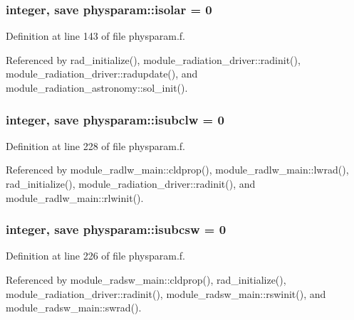 \subsubsection[{\texorpdfstring{isolar}{isolar}}]{\setlength{\rightskip}{0pt plus 5cm}integer, save physparam\+::isolar = 0}\hypertarget{namespacephysparam_adf09a9ec1939f1ee47bb4190a9098941}{}\label{namespacephysparam_adf09a9ec1939f1ee47bb4190a9098941}


Definition at line 143 of file physparam.\+f.



Referenced by rad\+\_\+initialize(), module\+\_\+radiation\+\_\+driver\+::radinit(), module\+\_\+radiation\+\_\+driver\+::radupdate(), and module\+\_\+radiation\+\_\+astronomy\+::sol\+\_\+init().

\subsubsection[{\texorpdfstring{isubclw}{isubclw}}]{\setlength{\rightskip}{0pt plus 5cm}integer, save physparam\+::isubclw = 0}\hypertarget{namespacephysparam_a9555bc46102e3c368ca1f15c73b0692e}{}\label{namespacephysparam_a9555bc46102e3c368ca1f15c73b0692e}


Definition at line 228 of file physparam.\+f.



Referenced by module\+\_\+radlw\+\_\+main\+::cldprop(), module\+\_\+radlw\+\_\+main\+::lwrad(), rad\+\_\+initialize(), module\+\_\+radiation\+\_\+driver\+::radinit(), and module\+\_\+radlw\+\_\+main\+::rlwinit().

\subsubsection[{\texorpdfstring{isubcsw}{isubcsw}}]{\setlength{\rightskip}{0pt plus 5cm}integer, save physparam\+::isubcsw = 0}\hypertarget{namespacephysparam_a2ec924900b312f94874ffb0f67d09dd9}{}\label{namespacephysparam_a2ec924900b312f94874ffb0f67d09dd9}


Definition at line 226 of file physparam.\+f.



Referenced by module\+\_\+radsw\+\_\+main\+::cldprop(), rad\+\_\+initialize(), module\+\_\+radiation\+\_\+driver\+::radinit(), module\+\_\+radsw\+\_\+main\+::rswinit(), and module\+\_\+radsw\+\_\+main\+::swrad().

